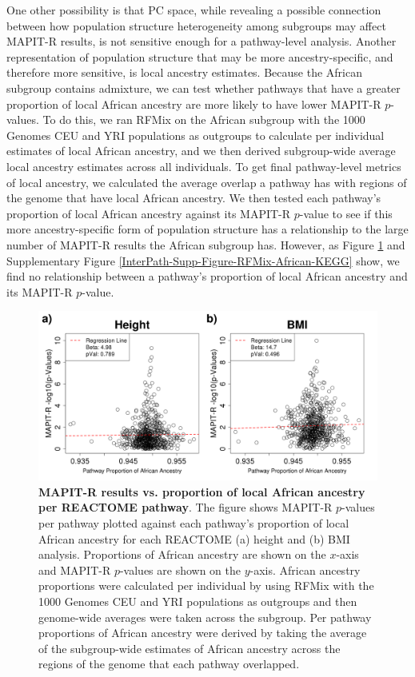 \documentclass[10pt,a4paper]{article}
\begin{document}
One other possibility is that PC space, while revealing a possible connection between how population structure heterogeneity among subgroups may affect MAPIT-R results, is not sensitive enough for a pathway-level analysis. Another representation of population structure that may be more ancestry-specific, and therefore more sensitive, is local ancestry estimates. Because the African subgroup contains admixture, we can test whether pathways that have a greater proportion of local African ancestry are more likely to have lower MAPIT-R $p$-values. To do this, we ran RFMix \citep{Maples2013} on the African subgroup with the 1000 Genomes CEU and YRI \citep{Genomes2015} populations as outgroups to calculate per individual estimates of local African ancestry, and we then derived subgroup-wide average local ancestry estimates across all individuals. To get final pathway-level metrics of local ancestry, we calculated the average overlap a pathway has with regions of the genome that have local African ancestry. We then tested each pathway's proportion of local African ancestry against its MAPIT-R $p$-value to see if this more ancestry-specific form of population structure has a relationship to the large number of MAPIT-R results the African subgroup has. However, as Figure \ref{InterPath-Main-Figure-RFMix-African-REACTOME} and Supplementary Figure \ref{InterPath-Supp-Figure-RFMix-African-KEGG} show, we find no relationship between a pathway's proportion of local African ancestry and its MAPIT-R $p$-value.

\begin{figure}[htb]
\centering
\includegraphics[scale=.35]{Images/Main/InterPath_Main_Figure_RFMix_vs2_African_REACTOME_noHLA.png}
\caption[TBD]{\textbf{MAPIT-R results vs. proportion of local African ancestry per REACTOME pathway}. The figure shows MAPIT-R $p$-values per pathway plotted against each pathway's proportion of local African ancestry for each REACTOME (a) height and (b) BMI analysis. Proportions of African ancestry are shown on the $x$-axis and MAPIT-R $p$-values are shown on the $y$-axis. African ancestry proportions were calculated per individual by using RFMix with the 1000 Genomes CEU and YRI populations as outgroups and then genome-wide averages were taken across the subgroup. Per pathway proportions of African ancestry were derived by taking the average of the subgroup-wide estimates of African ancestry across the regions of the genome that each pathway overlapped.}
\label{InterPath-Main-Figure-RFMix-African-REACTOME}
\end{figure}
\end{document}
